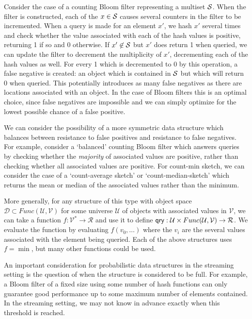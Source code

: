 Consider the case of a counting Bloom filter representing a multiset $\mathcal{S}$. When the filter is constructed, each of the $x \in \mathcal{S}$ causes several counters in the filter to be incremented. When a query is made for an element $x'$, we hash $x'$ several times and check whether the value associated with each of the hash values is positive, returning 1 if so and 0 otherwise. If $x' \not\in \mathcal{S}$ but $x'$ does return 1 when queried, we can update the filter to decrement the multiplicity of $x'$, decrementing each of the hash values as well. For every 1 which is decremented to 0 by this operation, a false negative is created: an object which is contained in $\mathcal{S}$ but which will return 0 when queried. This potentially introduces as many false negatives as there are locations associated with an object. In the case of Bloom filters this is an optimal choice, since false negatives are impossible and we can simply optimize for the lowest possible chance of a false positive.

We can consider the possibility of a more symmetric data structure which balances between resistance to false positives and resistance to false negatives. For example, consider a `balanced' counting Bloom filter which answers queries by checking whether the \emph{majority} of associated values are positive, rather than checking whether all associated values are positive. For count-min sketch, we can consider the case of a `count-average sketch' or `count-median-sketch' which returns the mean or median of the associated values rather than the minimum.

More generally, for any structure of this type with object space $\mathcal{D} \subset Func(\mathcal{U},\mathcal{V})$ for some universe $\mathcal{U}$ of objects with associated values in $\mathcal{V}$, we can take a function $f: \mathcal{V}^* \to \mathcal{R}$ and use it to define $\mathsf{qry}: \mathcal{U} \times Func(\mathcal{U},\mathcal{V}) \to \mathcal{R}$. We evaluate the function by evaluating $f(v_0,\ldots)$ where the $v_i$ are the several values associated with the element being queried. Each of the above structures uses $f = \min$, but many other functions could be used.

An important consideration for probabilistic data structures in the streaming setting is the question of when the structure is considered to be full. For example, a Bloom filter of a fixed size using some number of hash functions can only guarantee good performance up to some maximum number of elements contained. In the streaming setting, we may not know in advance exactly when this threshold is reached.